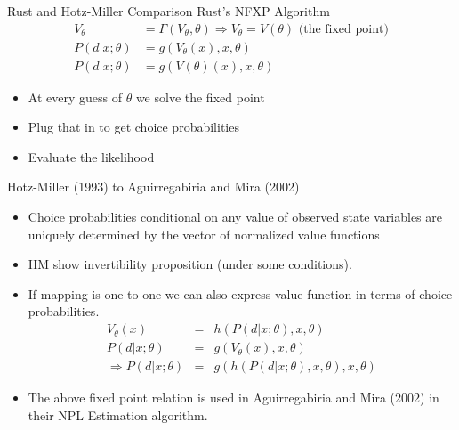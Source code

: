 \documentclass[aspectratio=169,11pt]{beamer}
\begin{document}
\begin{frame}{Rust and Hotz-Miller Comparison}
Rust's NFXP Algorithm
\begin{align*}
V_{\theta} &= \Gamma(V_{\theta},\theta) \Rightarrow  V_\theta = V(\theta) \text{ (the fixed point)}  \\
P(d | x;\theta) &= g(V_{\theta}(x),x,\theta) \\
P(d | x;\theta) &= g(V(\theta)(x),x,\theta)
\end{align*}
\begin{itemize}
\item At every guess of $\theta$ we solve the fixed point
\item Plug that in to get choice probabilities
\item Evaluate the likelihood
\end{itemize}
\end{frame}

\begin{frame}{Hotz-Miller (1993) to Aguirregabiria and Mira (2002)}
\begin{itemize}
\item Choice probabilities conditional on any value of observed state variables are uniquely determined by the vector of normalized value functions
\item HM show invertibility proposition (under some conditions).
\item If mapping is one-to-one we can also express value function in terms of choice probabilities.
\begin{eqnarray*}
V_{\theta}(x) &=& h(P(d | x;\theta),x,\theta)\\
P(d | x;\theta) &=& g(V_{\theta}(x),x,\theta) \\
\Rightarrow P(d | x;\theta) &=& g(h(P(d | x; \theta),x ,\theta),x,\theta)
\end{eqnarray*}
\item The above fixed point relation is used in Aguirregabiria and Mira (2002) in their NPL Estimation algorithm.
\end{itemize}
\end{frame}
\end{document}
